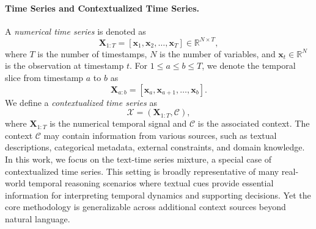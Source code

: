 \paragraph{Time Series and Contextualized Time Series.} A \textit{numerical time series} is denoted as
\begin{equation}
    \mathbf{X}_{1:T} = [\mathbf{x}_1, \mathbf{x}_2, \ldots, \mathbf{x}_T] \in \mathbb{R}^{N \times T},
\end{equation}
where $T$ is the number of timestamps, $N$ is the number of variables, and $\mathbf{x}_t \in \mathbb{R}^{N}$ is the observation at timestamp $t$. For $1 \leq a \leq b \leq T$, we denote the temporal slice from timestamp $a$ to $b$ as
\begin{equation}
    \mathbf{X}_{a:b}
    =
    [\mathbf{x}_a, \mathbf{x}_{a+1}, \ldots, \mathbf{x}_b].
\end{equation}
We define a \textit{contextualized time series} as
\begin{equation}
    \mathcal{X}
    =
    (\mathbf{X}_{1:T}, \mathcal{C}),
\end{equation}
where $\mathbf{X}_{1:T}$ is the numerical temporal signal and $\mathcal{C}$ is the associated context. The context $\mathcal{C}$ may contain information from various sources, such as textual descriptions, categorical metadata, external constraints, and domain knowledge. In this work, we focus on the text-time series mixture, a special case of contextualized time series. This setting is broadly representative of many real-world temporal reasoning scenarios where textual cues provide essential information for interpreting temporal dynamics and supporting decisions. Yet the core methodology is generalizable across additional context sources beyond natural language.
